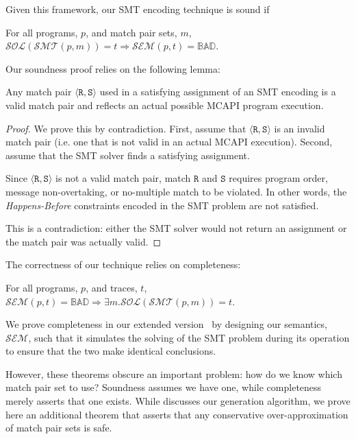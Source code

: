 Given this framework, our SMT encoding technique is sound if

\begin{theorem}[Soundness]
For all programs, $p$, and match pair sets, $m$,
$\mathcal{SOL}(\mathcal{SMT}(p, m)) = t \Rightarrow \mathcal{SEM}(p, t) =
\mathbb{BAD}$.
\end{theorem}

Our soundness proof relies on the following lemma:

\begin{lemma} \label{lem:bogus}
Any match pair $\langle \mathtt{R}, \mathtt{S}\rangle$ used in a
satisfying assignment of an SMT encoding is a valid match pair and
reflects an actual possible MCAPI program execution.
\end{lemma}
\begin{proof}
We prove this by contradiction. First, assume that $\langle
\mathtt{R}, \mathtt{S}\rangle$ is an invalid match pair (i.e. one that
is not valid in an actual MCAPI execution). Second, assume that the
SMT solver finds a satisfying assignment.

Since $\langle \mathtt{R}, \mathtt{S}\rangle$ is not a valid match
pair, match $\mathtt{R}$ and $\mathtt{S}$ requires program order,
message non-overtaking, or no-multiple match to be violated. In other
words, the \emph{Happens-Before} constraints encoded in the SMT
problem are not satisfied.

This is a contradiction: either the SMT solver would not return an
assignment or the match pair was actually valid.
\end{proof}

The correctness of our technique relies on completeness:

\begin{theorem}[Completeness]
For all programs, $p$, and traces, $t$, $\mathcal{SEM}(p, t) =
\mathbb{BAD} \Rightarrow \exists m . \mathcal{SOL}(\mathcal{SMT}(p,
m)) = t$.
\end{theorem}

We prove completeness in our extended version~\cite{extended-version}
by designing our semantics, $\mathcal{SEM}$, such that it simulates
the solving of the SMT problem during its operation to ensure that the
two make identical conclusions.

However, these theorems obscure an important problem: how do we know
which match pair set to use? Soundness assumes we have one, while
completeness merely asserts that one exists. While 
discusses our generation algorithm, we prove here an additional
theorem that asserts that any conservative over-approximation of match
pair sets is safe.

